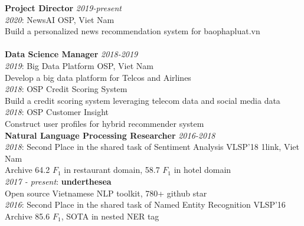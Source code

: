 \documentclass[11pt,a4paper,roman]{article}
\begin{document}
\textbf{Project Director}
\hfill
\textit{2019-present}
\\
\textit{2020}: NewsAI
\hfill
OSP, Viet Nam
\\
Build a personalized news recommendation system for baophapluat.vn
\\\\
\textbf{Data Science Manager}
\hfill
\textit{2018-2019}
\\
\textit{2019}: Big Data Platform
\hfill
OSP, Viet Nam
\\
Develop a big data platform for Telcos and Airlines
\\
\textit{2018}: OSP Credit Scoring System
\\
Build a credit scoring system leveraging telecom data and social media data
\\
\textit{2018}: OSP Customer Insight
\\
Construct user profiles for hybrid recommender system
\\


\noindent
\textbf{Natural Language Processing Researcher}
\hfill
\textit{2016-2018}
\\
\textit{2018}: Second Place in the shared task of Sentiment Analysis VLSP'18
\hfill
1link, Viet Nam
\\
Archive 64.2 $F_{1}$ in restaurant domain, 58.7 $F_{1}$ in hotel domain
\\
\textit{2017 - present}: \textbf{underthesea}
\\\noindent
Open source Vietnamese NLP toolkit, 780+ github star
\\
\textit{2016}: Second Place in the shared task of Named Entity Recognition VLSP'16
\\
Archive 85.6 $F_{1}$, SOTA in nested NER tag
\\
\end{document}
